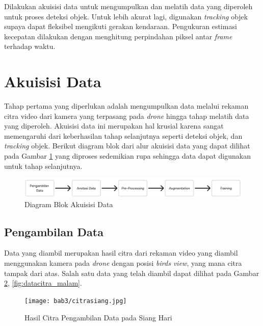 Dilakukan akuisisi data untuk mengumpulkan dan melatih data yang diperoleh untuk proses deteksi objek. Untuk lebih akurat lagi, digunakan \emph{tracking} objek supaya dapat fleksibel mengikuti gerakan kendaraan. Pengukuran estimasi kecepatan dilakukan dengan menghitung perpindahan piksel antar \emph{frame} terhadap waktu.

\section{Akuisisi Data}
Tahap pertama yang diperlukan adalah mengumpulkan data melalui rekaman citra video dari kamera yang terpasang pada \emph{drone} hingga tahap melatih data yang diperoleh. Akuisisi data ini merupakan hal krusial karena sangat memengaruhi dari keberhasilan tahap selanjutnya seperti deteksi objek, dan \emph{tracking} objek. Berikut diagram blok dari alur akuisisi data yang dapat dilihat pada Gambar \ref{fig:akuisisidata} yang diproses sedemikian rupa sehingga data dapat digunakan untuk tahap selanjutnya.

\begin{figure} [H] \centering
  \includegraphics[scale=0.35]{bab3/akuisisidata.jpg}
  \caption{Diagram Blok Akuisisi Data}
  \label{fig:akuisisidata}
\end{figure}

\subsection{Pengambilan Data}
Data yang diambil merupakan hasil citra dari rekaman video yang diambil menggunakan kamera pada \emph{drone} dengan posisi \emph{birds view}, yang mana citra tampak dari atas. Salah satu data yang telah diambil dapat dilihat pada Gambar \ref{fig:datacitra_siang}, \ref{fig:datacitra_malam}.

\begin{figure} [H] \centering
  \texttt{[image: bab3/citrasiang.jpg]}
  \caption{Hasil Citra Pengambilan Data pada Siang Hari}
  \label{fig:datacitra_siang}
\end{figure}

